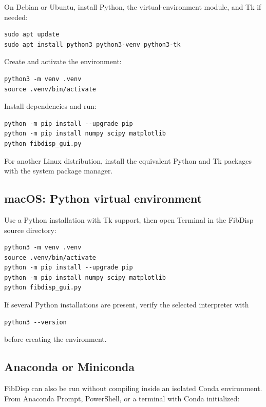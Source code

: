 \documentclass[11pt,a4paper]{article}
\begin{document}
On Debian or Ubuntu, install Python, the virtual-environment module, and Tk if
needed:

\begin{lstlisting}
sudo apt update
sudo apt install python3 python3-venv python3-tk
\end{lstlisting}

Create and activate the environment:

\begin{lstlisting}
python3 -m venv .venv
source .venv/bin/activate
\end{lstlisting}

Install dependencies and run:

\begin{lstlisting}
python -m pip install --upgrade pip
python -m pip install numpy scipy matplotlib
python fibdisp_gui.py
\end{lstlisting}

For another Linux distribution, install the equivalent Python and Tk packages
with the system package manager.

\subsection{macOS: Python virtual environment}

Use a Python installation with Tk support, then open Terminal in the FibDisp
source directory:

\begin{lstlisting}
python3 -m venv .venv
source .venv/bin/activate
python -m pip install --upgrade pip
python -m pip install numpy scipy matplotlib
python fibdisp_gui.py
\end{lstlisting}

If several Python installations are present, verify the selected interpreter
with

\begin{lstlisting}
python3 --version
\end{lstlisting}

before creating the environment.

\subsection{Anaconda or Miniconda}

FibDisp can also be run without compiling inside an isolated Conda environment.
From Anaconda Prompt, PowerShell, or a terminal with Conda initialized:
\end{document}
